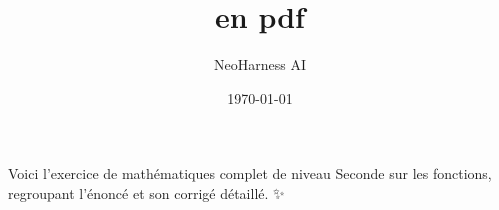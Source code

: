 \documentclass[11pt,a4paper]{article}
\title{en pdf}
\author{NeoHarness AI}
\date{\today}
\begin{document}
\maketitle

Voici l'exercice de mathématiques complet de niveau Seconde sur les fonctions, regroupant l'énoncé et son corrigé détaillé. ✨
\end{document}
